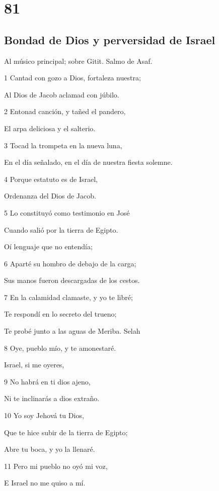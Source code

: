 \chapter{81}

\section*{Bondad de Dios y perversidad de Israel}

\par Al músico principal; sobre Gitit. Salmo de Asaf.

\par 1 Cantad con gozo a Dios, fortaleza nuestra;
\par Al Dios de Jacob aclamad con júbilo.
\par 2 Entonad canción, y tañed el pandero,
\par El arpa deliciosa y el salterio.
\par 3 Tocad la trompeta en la nueva luna,
\par En el día señalado, en el día de nuestra fiesta solemne.
\par 4 Porque estatuto es de Israel,
\par Ordenanza del Dios de Jacob.
\par 5 Lo constituyó como testimonio en José
\par Cuando salió por la tierra de Egipto.
\par Oí lenguaje que no entendía;
\par 6 Aparté su hombro de debajo de la carga;
\par Sus manos fueron descargadas de los cestos.
\par 7 En la calamidad clamaste, y yo te libré;
\par Te respondí en lo secreto del trueno;
\par Te probé junto a las aguas de Meriba. Selah
\par 8 Oye, pueblo mío, y te amonestaré.
\par Israel, si me oyeres,
\par 9 No habrá en ti dios ajeno,
\par Ni te inclinarás a dios extraño.
\par 10 Yo soy Jehová tu Dios,
\par Que te hice subir de la tierra de Egipto;
\par Abre tu boca, y yo la llenaré.
\par 11 Pero mi pueblo no oyó mi voz,
\par E Israel no me quiso a mí.
